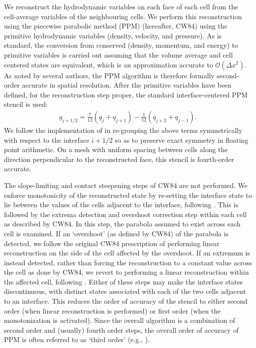 \documentclass[fleqn,usenatbib]{mnras}
\begin{document}
We reconstruct the hydrodynamic variables on each face of each cell from the cell-average variables of the neighbouring cells. We perform this reconstruction using the piecewise parabolic method (PPM) \citep{Colella_1984} (hereafter, CW84) using the primitive hydrodynamic variables (density, velocity, and pressure). As is standard, the conversion from conserved (density, momentum, and energy) to primitive variables is carried out assuming that the volume average and cell centered states are equivalent, which is an approximation accurate to $\mathcal{O}(\Delta x^2)$. As noted by several authors, the PPM algorithm is therefore formally second-order accurate in spatial resolution. After the primitive variables have been defined, for the reconstruction step proper, the standard interface-centered PPM stencil is used:
\begin{align}
q_{j+1/2} = \frac{7}{12} (q_j + q_{j+1}) - \frac{1}{12} (q_{j+2} + q_{j-1}).
\end{align}
We follow the implementation of \cite{Stone_2020} in re-grouping the above terms symmetrically with respect to the interface ${i+{1/2}}$ so as to preserve exact symmetry in floating point arithmetic. On a mesh with uniform spacing between cells along the direction perpendicular to the reconstructed face, this stencil is fourth-order accurate.

The slope-limiting and contact steepening steps of CW84 are not performed. We enforce monotonicity of the reconstructed state by re-setting the interface state to lie between the values of the cells adjacent to the interface, following \cite{Mignone_2005}. This is followed by the extrema detection and overshoot correction step within each cell as described by CW84. In this step, the parabola assumed to exist across each cell is examined. If an `overshoot' (as defined by CW84) of the parabola is detected, we follow the original CW84 prescription of performing linear reconstruction on the side of the cell affected by the overshoot. If an extremum is instead detected, rather than forcing the reconstruction to a constant value across the cell as done by CW84, we revert to performing a linear reconstruction within the affected cell, following \cite{Balsara_2017}. Either of these steps may make the interface states discontinuous, with distinct states associated with each of the two cells adjacent to an interface. This reduces the order of accuracy of the stencil to either second order (when linear reconstruction is performed) or first order (when the monotonization is activated). Since the overall algorithm is a combination of second order and (usually) fourth order steps, the overall order of accuracy of PPM is often referred to as `third order' (e.g., \citealt{Stone_2020}).
\end{document}
